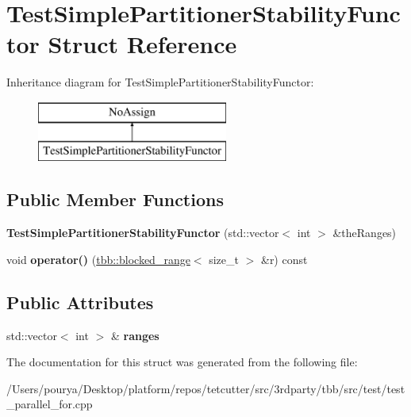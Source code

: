 \hypertarget{structTestSimplePartitionerStabilityFunctor}{}\section{Test\+Simple\+Partitioner\+Stability\+Functor Struct Reference}
\label{structTestSimplePartitionerStabilityFunctor}
Inheritance diagram for Test\+Simple\+Partitioner\+Stability\+Functor\+:\begin{figure}[H]
\begin{center}
\leavevmode
\includegraphics[height=2.000000cm]{structTestSimplePartitionerStabilityFunctor}
\end{center}
\end{figure}
\subsection*{Public Member Functions}
\begin{DoxyCompactItemize}
\item 
\hypertarget{structTestSimplePartitionerStabilityFunctor_a953731c32f512f92f7eff7b9f6437ff5}{}{\bfseries Test\+Simple\+Partitioner\+Stability\+Functor} (std\+::vector$<$ int $>$ \&the\+Ranges)\label{structTestSimplePartitionerStabilityFunctor_a953731c32f512f92f7eff7b9f6437ff5}

\item 
\hypertarget{structTestSimplePartitionerStabilityFunctor_afc0b12503c258a25e9244f23bc525c3b}{}void {\bfseries operator()} (\hyperlink{classtbb_1_1blocked__range}{tbb\+::blocked\+\_\+range}$<$ size\+\_\+t $>$ \&r) const \label{structTestSimplePartitionerStabilityFunctor_afc0b12503c258a25e9244f23bc525c3b}

\end{DoxyCompactItemize}
\subsection*{Public Attributes}
\begin{DoxyCompactItemize}
\item 
\hypertarget{structTestSimplePartitionerStabilityFunctor_a6130491f83a9c871f3617852bc9d77da}{}std\+::vector$<$ int $>$ \& {\bfseries ranges}\label{structTestSimplePartitionerStabilityFunctor_a6130491f83a9c871f3617852bc9d77da}

\end{DoxyCompactItemize}


The documentation for this struct was generated from the following file\+:\begin{DoxyCompactItemize}
\item 
/\+Users/pourya/\+Desktop/platform/repos/tetcutter/src/3rdparty/tbb/src/test/test\+\_\+parallel\+\_\+for.\+cpp\end{DoxyCompactItemize}
